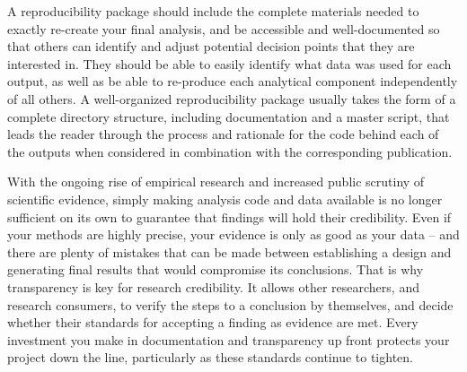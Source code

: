 A reproducibility package should include the complete materials needed
to exactly re-create your final analysis,
and be accessible and well-documented so that others can identify
and adjust potential decision points that they are interested in.
They should be able to easily identify what data was used for each output,
as well as be able to re-produce each analytical component independently of all others.
A well-organized reproducibility package usually takes the form
of a complete directory structure, including documentation and a master script,
that leads the reader through the process and rationale
for the code behind each of the outputs
when considered in combination with the corresponding publication.

With the ongoing rise of empirical research and increased public scrutiny of scientific evidence,
simply making analysis code and data available
is no longer sufficient on its own to guarantee that findings will hold their credibility.
Even if your methods are highly precise,
your evidence is only as good as your data --
and there are plenty of mistakes that can be made between
establishing a design and generating final results that would compromise its conclusions.
That is why transparency is key for research credibility.
It allows other researchers, and research consumers,
to verify the steps to a conclusion by themselves,
and decide whether their standards for accepting a finding as evidence are met.
Every investment you make in documentation and transparency up front
protects your project down the line, particularly as these standards continue to tighten.
